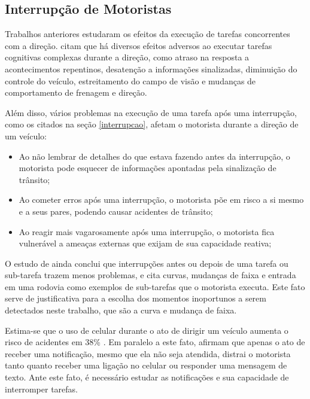 \subsection{Interrupção de Motoristas}
\label{interrupcao-motoristas}

Trabalhos anteriores estudaram os efeitos da execução de tarefas concorrentes com a direção.  citam
que há diversos efeitos adversos ao executar tarefas cognitivas complexas durante a direção, como atraso na resposta a
acontecimentos repentinos, desatenção a informações sinalizadas, diminuição do controle do veículo, estreitamento do campo
de visão e mudanças de comportamento de frenagem e direção.

Além disso, vários problemas na execução de uma tarefa após uma interrupção, como os citados na seção \ref{interrupcao}, afetam o
motorista durante a direção de um veículo:

\begin{itemize}
  \item Ao não lembrar de detalhes do que estava fazendo antes da interrupção, o motorista pode esquecer de informações
  apontadas pela sinalização de trânsito;
  \item Ao cometer erros após uma interrupção, o motorista põe em risco a si mesmo e a seus pares, podendo causar acidentes
  de trânsito;
  \item Ao reagir mais vagarosamente após uma interrupção, o motorista fica vulnerável a ameaças externas que exijam de sua
  capacidade reativa;
\end{itemize}

O estudo de  ainda conclui que interrupções antes ou depois de uma tarefa ou sub-tarefa trazem
menos problemas, e cita curvas, mudanças de faixa e entrada em uma rodovia como exemplos de sub-tarefas que o motorista executa.
Este fato serve de justificativa para a escolha dos momentos inoportunos a serem detectados neste trabalho, que são a curva
e mudança de faixa.

Estima-se que o uso de celular durante o ato de dirigir um veículo aumenta o risco de acidentes em 38\% \cite{laberge2001wireless}.
Em paralelo a este fato,  afirmam que apenas o ato de receber uma notificação, mesmo que ela não seja
atendida, distrai o motorista tanto quanto receber uma ligação no celular ou responder uma mensagem de texto. Ante este fato, é
necessário estudar as notificações e sua capacidade de interromper tarefas.

